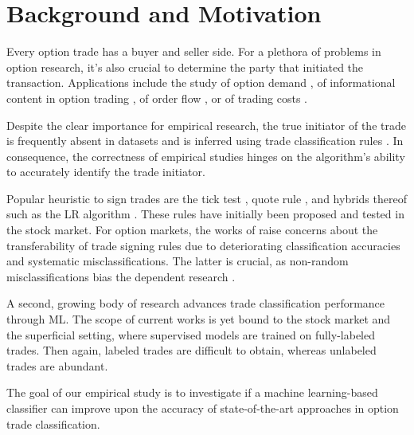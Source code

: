 

\section{Background and Motivation}

Every option trade has a buyer and seller side. For a plethora of problems in option research, it’s also crucial to determine the party that initiated the transaction. Applications include the study of option demand \autocite[][]{garleanuDemandBasedOptionPricing2009}, of informational content in option trading \autocites[][]{huDoesOptionTrading2014}[][]{panInformationOptionVolume2006}[][]{caoInformationalContentOption2005}, of order flow \autocite[][]{muravyevOrderFlowExpected2016}, or of trading costs \autocite[][]{muravyevOptionsTradingCosts2020}. 

Despite the clear importance for empirical research, the true initiator of the trade is frequently absent in datasets and is inferred using trade classification rules \autocite[][]{easleyOptionVolumeStock1998}. In consequence, the correctness of empirical studies hinges on the algorithm's ability to accurately identify the trade initiator.

Popular heuristic to sign trades are the tick test \autocite[][]{hasbrouckTradesQuotesInventories1988}, quote rule \autocite[][]{harrisDayEndTransactionPrice1989}, and hybrids thereof such as the \gls{LR} algorithm \autocite[][]{leeInferringTradeDirection1991}. These rules have initially been proposed and tested in the stock market. For option markets, the works of \textcites[][]{savickasInferringDirectionOption2003}[][]{grauerOptionTradeClassification2022} raise concerns about the transferability of trade signing rules due to deteriorating classification accuracies and systematic misclassifications. The latter is crucial, as non-random misclassifications bias the dependent research \autocites[][]{odders-whiteOccurrenceConsequencesInaccurate2000}[][]{theissenTestAccuracyLee2001}.

A second, growing body of research \autocites{blazejewskiLocalNonParametricModel2005}{rosenthalModelingTradeDirection2012}{ronenMachineLearningTrade2022} advances trade classification performance through \gls{ML}. The scope of current works is yet bound to the stock market and the superficial setting, where supervised models are trained on fully-labeled trades. Then again, labeled trades are difficult to obtain, whereas unlabeled trades are abundant.

The goal of our empirical study is to investigate if a machine learning-based classifier can improve upon the accuracy of state-of-the-art approaches in option trade classification.

